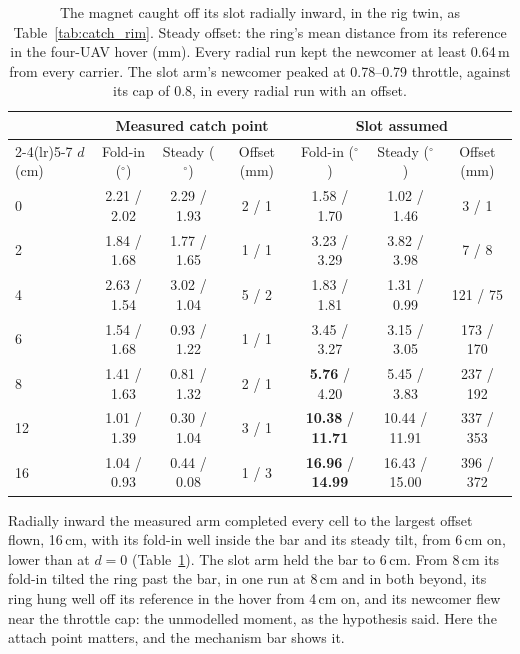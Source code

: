 \begin{table}[htbp]
\centering
\footnotesize
\setlength{\tabcolsep}{3pt}
\caption[The magnet caught off its slot, radially in]{The magnet caught off its slot radially inward, in the rig twin,
as Table~\ref{tab:catch_rim}. Steady offset: the ring's mean distance from its reference in the four-UAV hover (mm).
Every radial run kept the newcomer at least 0.64\,m from every carrier. The slot arm's newcomer peaked at 0.78--0.79
throttle, against its cap of 0.8, in every radial run with an offset.}
\label{tab:catch_in}
\begin{tabular}{lcccccc}
\toprule
 & \multicolumn{3}{c}{Measured catch point} & \multicolumn{3}{c}{Slot assumed} \\
\cmidrule(lr){2-4}\cmidrule(lr){5-7}
$d$ (cm) & Fold-in ($^\circ$) & Steady ($^\circ$) & Offset (mm) & Fold-in ($^\circ$) & Steady ($^\circ$) & Offset (mm) \\
\midrule
0 & 2.21 / 2.02 & 2.29 / 1.93 & 2 / 1 & 1.58 / 1.70 & 1.02 / 1.46 & 3 / 1 \\
2 & 1.84 / 1.68 & 1.77 / 1.65 & 1 / 1 & 3.23 / 3.29 & 3.82 / 3.98 & 7 / 8 \\
4 & 2.63 / 1.54 & 3.02 / 1.04 & 5 / 2 & 1.83 / 1.81 & 1.31 / 0.99 & 121 / 75 \\
6 & 1.54 / 1.68 & 0.93 / 1.22 & 1 / 1 & 3.45 / 3.27 & 3.15 / 3.05 & 173 / 170 \\
8 & 1.41 / 1.63 & 0.81 / 1.32 & 2 / 1 & \textbf{5.76} / 4.20 & 5.45 / 3.83 & 237 / 192 \\
12 & 1.01 / 1.39 & 0.30 / 1.04 & 3 / 1 & \textbf{10.38} / \textbf{11.71} & 10.44 / 11.91 & 337 / 353 \\
16 & 1.04 / 0.93 & 0.44 / 0.08 & 1 / 3 & \textbf{16.96} / \textbf{14.99} & 16.43 / 15.00 & 396 / 372 \\
\bottomrule
\end{tabular}
\end{table}

Radially inward the measured arm completed every cell to the largest offset flown, 16\,cm, with its fold-in well inside
the bar and its steady tilt, from 6\,cm on, lower than at $d = 0$ (Table~\ref{tab:catch_in}). The slot arm held the bar
to 6\,cm. From 8\,cm its fold-in tilted the ring past the bar, in one run at 8\,cm and in both beyond, its ring hung
well off its reference in the hover from 4\,cm on, and its newcomer flew near the throttle cap: the unmodelled moment,
as the hypothesis said. Here the attach point matters, and the mechanism bar shows it.

